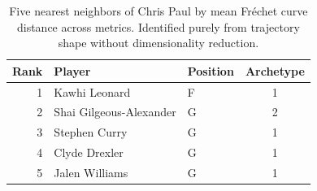\begin{table}[htbp]
  \centering\small
  \begin{tabular}{rllc}
    \toprule
    Rank & Player & Position & Archetype \\
    \midrule
    1 & Kawhi Leonard & F & 1 \\
    2 & Shai Gilgeous-Alexander & G & 2 \\
    3 & Stephen Curry & G & 1 \\
    4 & Clyde Drexler & G & 1 \\
    5 & Jalen Williams & G & 1 \\
    \bottomrule
  \end{tabular}
  \caption{Five nearest neighbors of Chris Paul by mean Fr\'{e}chet curve distance across metrics. Identified purely from trajectory shape without dimensionality reduction.}
  \label{tab:Chris_Paul_frechet_curve_neighbors}
\end{table}

